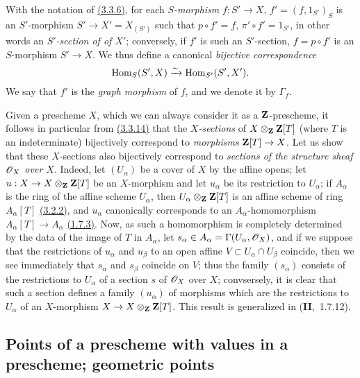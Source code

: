 \begin{env}[3.3.14]
\label{env-1.3.3.14}
With the notation of \hyperref[env-1.3.3.6]{(3.3.6)}, for each {\it $S$-morphism}
$f:S'\to X$, $f'=(f,1_{S'})_S$ is an $S'$-morphism $S'\to X'=X_{(S')}$ such that
$p\circ f'=f$, $\pi'\circ f'=1_{S'}$, in other words an {\it $S'$-section of
of $X'$}; conversely, if $f'$ is such an $S'$-section, $f=p\circ f'$ is an
$S$-morphism $S'\to X$. We thus define a canonical
{\it bijective correspondence}
\[
  {\mathop{\mathrm{Hom}}\nolimits}_S(S',X)\xrightarrow{\sim}{\mathop{\mathrm{Hom}}\nolimits}_{S'}(S',X').
\]
We say that $f'$ is the {\it graph morphism} of $f$, and we denote it by
$\Gamma_f$.
\end{env}

\begin{env}[3.3.15]
\label{env-1.3.3.15}
Given a prescheme $X$, which we can always consider it as a $\mathbf{Z}$-prescheme,
it follows in particular from \hyperref[env-1.3.3.14]{(3.3.14)} that the {\it $X$-sections} of
$X\otimes_\mathbf{Z}\mathbf{Z}[T]$ (where $T$ is an indeterminate) bijectively
correspond to {\it morphisms} $\mathbf{Z}[T]\to X$. Let us show that these
$X$-sections also bijectively correspond to {\it sections of the structure
sheaf $\mathscr{O}_X$ over $X$}. Indeed, let $(U_\alpha)$ be a cover of $X$ by the
affine opens; let $u:X\to X\otimes_\mathbf{Z}\mathbf{Z}[T]$ be an $X$-morphism and let
$u_\alpha$ be its restriction to $U_\alpha$; if $A_\alpha$ is the ring of the
affine scheme $U_\alpha$, then $U_\alpha\otimes_\mathbf{Z}\mathbf{Z}[T]$ is an affine
scheme of ring $A_\alpha[T]$ \hyperref[prop-1.3.2.2]{(3.2.2)}, and $u_\alpha$ canonically
corresponds to an $A_\alpha$-homomorphism $A_\alpha[T]\to A_\alpha$
\hyperref[thm-1.1.7.3]{(1.7.3)}. Now, as such a homomorphism is completely determined by the
data of the image of $T$ in $A_\alpha$, let
$s_\alpha\in A_\alpha=\Gamma(U_\alpha,\mathscr{O}_X)$, and if we suppose that the
restrictions of $u_\alpha$ and $u_\beta$ to an open affine
$V\subset U_\alpha\cap U_\beta$ coincide, then we see immediately that
$s_\alpha$ and $s_\beta$ coincide on $V$; thus the family $(s_\alpha)$ consists
of the restrictions to $U_\alpha$ of a section $s$ of $\mathscr{O}_X$ over $X$;
convsersely, it is clear that such a section defines a family $(u_\alpha)$ of
morphisms which are the restrictions to $U_\alpha$ of an $X$-morphism
$X\to X\otimes_\mathbf{Z}\mathbf{Z}[T]$. This result is generalized in
(\textbf{II},~1.7.12).
\end{env}

\subsection{Points of a prescheme with values in a prescheme; geometric points}
\label{subsection-prescheme-geometric-points}

